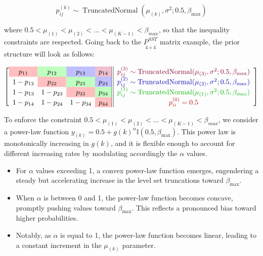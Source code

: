 \documentclass[11pt]{amsart}
\begin{document}
\begin{equation}
p_{ij}^{(k)} \sim \operatorname{TruncatedNormal}(\mu_{(k)}, \sigma^{2}; 0.5, \beta_{\max})
\end{equation}

where $0.5 < \mu_{(1)} < \mu_{(2)} < \ldots < \mu_{(K-1)}< \beta_{max}$, so that the inequality constraints are respected. Going back to the $\underset{4\times4}{P^{SST }}$ matrix example, the prior structure will look as follows:

\vspace{.5cm}
\begin{equation}
\left[
\begin{array}{cccc || c}
\cellcolor{red!25} p_{11} & \cellcolor{green!25} p_{12} & \cellcolor{blue!25} p_{13} & \cellcolor{purple!25} p_{14} &\textcolor{purple!70!black}{p_{ij}^{(3)} \sim \operatorname{TruncatedNormal}(\mu_{(3)}, \sigma^{2}; 0.5, \beta_{\max})}  \\
1- p_{12} & \cellcolor{red!25} p_{22} & \cellcolor{green!25} p_{23} & \cellcolor{blue!25} p_{24} &\textcolor{blue!70!black}{p_{ij}^{(2)} \sim \operatorname{TruncatedNormal}(\mu_{(2)}, \sigma^{2}; 0.5, \beta_{\max})}\\
1- p_{13}  & 1- p_{23}  & \cellcolor{red!25} p_{33} & \cellcolor{green!25} p_{34} & \textcolor{green!70!black}{p_{ij}^{(1)} \sim \operatorname{TruncatedNormal}(\mu_{(1)}, \sigma^{2}; 0.5, \beta_{\max})}\\
1- p_{14} & 1- p_{24}  & 1- p_{34}  & \cellcolor{red!25} p_{44} &\textcolor{red!70!black}{p_{ii}^{(0)}=0.5}  \\
\end{array}
\right]
\label{eq_matrix_example}
\end{equation}

\vspace{.5cm}

To enforce the constraint $0.5 < \mu_{(1)} < \mu_{(2)} < \ldots < \mu_{(K-1)}< \beta_{max}$, we consider a power-law function $y_{(k)} = 0.5 + g(k)^\alpha \mathbb{I}\left(0.5,\beta_{\max}\right)$. This power law is monotonically increasing in $g(k)$, and it is flexible enough to account for different increasing rates by modulating accordingly the $\alpha$ values.

\begin{itemize}
    \item For \(\alpha\) values exceeding 1, a convex power-law function emerges, engendering a steady but accelerating increase in the level set truncations toward \(\beta_{\max}\).
    
    \item When \(\alpha\) is between 0 and 1, the power-law function becomes concave, promptly pushing values toward \(\beta_{\max}\). This reflects a pronounced bias toward higher probabilities.
    
    \item Notably, as \(\alpha\) is equal to 1, the power-law function becomes linear, leading to a constant increment in the $\mu_{(k)}$ parameter.
\end{itemize}
\end{document}

